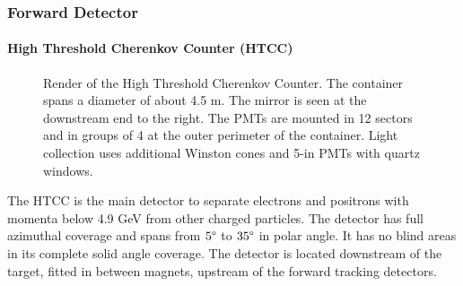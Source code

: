 \subsubsection{Forward Detector} \label{sssec::forwarddetector}

\paragraph{High Threshold Cherenkov Counter (HTCC)}
    \begin{figure}
        \centering{}
        \caption[HTCC]{Render of the High Threshold Cherenkov Counter.
        The container spans a diameter of about 4.5 m. The mirror is seen at the downstream end to the right.
        The PMTs are mounted in 12 sectors and in groups of 4 at the outer perimeter of the container.
        Light collection uses additional Winston cones and 5-in PMTs with quartz windows.}
        \label{fig::htcc}
    \end{figure}

    The HTCC is the main detector to separate electrons and positrons with momenta below 4.9 GeV from other charged particles.
    The detector has full azimuthal coverage and spans from $5\degree$ to $35\degree$ in polar angle.
    It has no blind areas in its complete solid angle coverage.
    The detector is located downstream of the target, fitted in between magnets, upstream of the forward tracking detectors.

